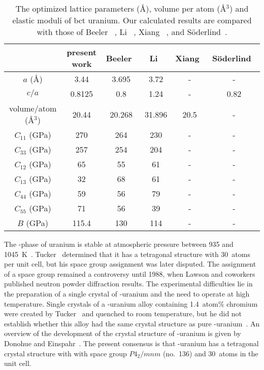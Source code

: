 \begin{table}
\caption[Comparison of ground-state properties and elastic moduli of bct uranium with previous work]{The optimized lattice parameters (\AA), volume per atom (\AA$^3$) and elastic moduli of bct uranium. Our calculated results are compared with those of Beeler \etal~\cite{beeler2013first}, Li \etal~\cite{li2012structure},
Xiang \etal~\cite{xiang2008quantum}, and S\"oderlind~\cite{Soderlind1998}.}
\label{table:eq_bct}
\begin{tabular}{cccccc}
  \hline
		& present work & Beeler~\cite{beeler2013first} & Li~\cite{li2012structure} & Xiang~\cite{xiang2008quantum} & S\"oderlind~\cite{Soderlind1998} \\ \hline
$a$ (\AA)		&   3.44	   & 3.695	& 3.72 & - & -\\
$c/a$	&	0.8125	   & 0.8	& 1.24 & - & 0.82 \\
volume/atom (\AA$^3$)& 20.44	   & 20.268 & 31.896 & 20.5 & - \\
$C_{11}$ (GPa) &  270		   & 264	& 230 & - & -	\\
$C_{33}$ (GPa) &  257		   & 254	& 204 & - & -	\\
$C_{12}$ (GPa) &  65		   & 55		& 61 & - & -	\\
$C_{13}$ (GPa) &	32		   & 68		& 61 & - & -	\\
$C_{44}$ (GPa) &	59		   & 56		& 79 & - & -	\\
$C_{55}$ (GPa) &	71		   & 56		& 39 & - & - \\
$B$ (GPa)    &	115.4	   & 130	& 114  & - & - \\
  \hline
\end{tabular}
\end{table}
The \textbeta-phase of uranium is stable at atmospheric pressure between 935
and 1045~K~\cite{lawson1988structure}.
Tucker~\cite{tucker1950approximate} determined that it has a tetragonal
structure with 30~atoms per unit cell, but his space group assignment was
later disputed. The assignment of a space group remained a controversy until
1988, when Lawson and coworkers~\cite{lawson1988structure} published neutron
powder diffraction results.
The experimental difficulties lie in the preparation of a single crystal of
\textbeta-uranium and the need to operate at high temperature.
Single crystals of a \textbeta-uranium alloy containing 1.4~atom\% chromium
were created by Tucker~\cite{tucker1951crystal} and quenched to room
temperature, but he did not establish whether this alloy had the same crystal
structure as pure \textbeta-uranium~\cite{lawson1988structure}. An overview of
the development of the crystal structure of \textbeta-uranium is given by
Donohue and Einspahr~\cite{donohue1971structure, donohue1974structures}. The
present consensus is that \textbeta-uranium has a tetragonal crystal structure
with with space group $P4_2/mnm$ (no.~136) and 30~atoms in the unit cell.

